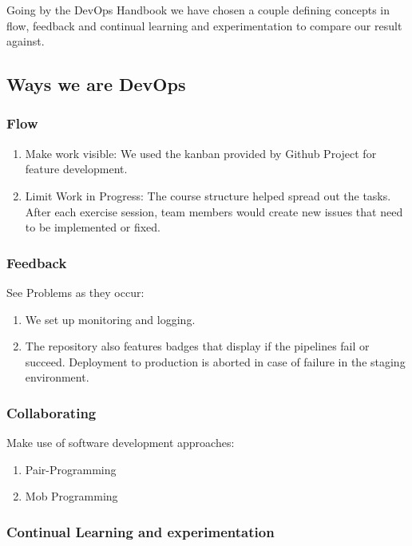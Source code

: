 \documentclass{article}
\begin{document}
Going by the DevOps Handbook \cite{devopshandbook} we have chosen a couple defining concepts in flow, feedback and continual learning and experimentation to compare our result against. 

\subsection{Ways we are DevOps}

\subsubsection{Flow}

\begin{enumerate}
    \item Make work visible: We used the kanban provided by Github Project for feature development. 
    \item Limit Work in Progress: The course structure helped spread out the tasks. After each exercise session, team members would create new issues that need to be implemented or fixed.
\end{enumerate}

\subsubsection{Feedback}

See Problems as they occur: 

\begin{enumerate}
    \item We set up monitoring and logging.
    \item The repository also features badges that display if the pipelines fail or succeed. Deployment to production is aborted in case of failure in the staging environment.
\end{enumerate}

\subsubsection{Collaborating}

Make use of software development approaches:

\begin{enumerate}
    \item Pair-Programming
    \item Mob Programming
\end{enumerate}

\subsubsection{Continual Learning and experimentation}
\end{document}

